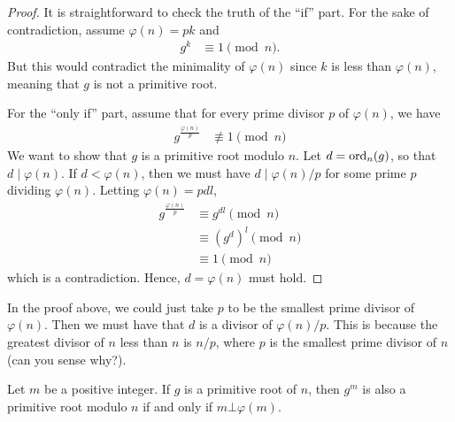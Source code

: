 \documentclass{subfile}
\begin{document}
	\begin{proof}
		It is straightforward to check the truth of the ``if'' part. For the sake of contradiction, assume $\varphi(n)=pk$ and
			\begin{align*}
				g^{k} & \equiv1\pmod n.
			\end{align*}
		But this would contradict the minimality of $\varphi(n)$ since $k$ is less than $\varphi(n)$, meaning that $g$ is not a primitive root.

		For the ``only if'' part, assume that for every prime divisor $p$ of $\varphi(n)$, we have
			\begin{align*}
				g^{\frac{\varphi(n)}{p}}
					& \not\equiv1\pmod n
			\end{align*}
		We want to show that $g$ is a primitive root modulo $n$. Let $d=\operatorname{ord}_n(g)$, so that $d \mid \varphi(n)$. If $d<\varphi(n)$, then we must have $d\mid {\varphi(n)}/{p}$ for some prime $p$ dividing $\varphi(n)$. Letting $\varphi(n)=pdl$,
			\begin{align*}
				g^{\frac{\varphi(n)}{p}}
					& \equiv g^{dl}\pmod{n}\\
					& \equiv \left(g^d\right)^l\pmod{n}\\
					& \equiv1\pmod n
			\end{align*}
		which is a contradiction. Hence, $d=\varphi(n)$ must hold.
	\end{proof}

	\begin{note}
		In the proof above, we could just take $p$ to be the smallest prime divisor of $\varphi(n)$. Then we must have that $d$ is a divisor of ${\varphi(n)}/{p}$. This is because the greatest divisor of $n$ less than $n$ is ${n}/{p}$, where $p$ is the smallest prime divisor of $n$ (can you sense why?).
	\end{note}

	\begin{corollary}\label{cor:prpower}
		Let $m$ be a positive integer. If $g$ is a primitive root of $n$, then $g^m$ is also a primitive root modulo $n$ if and only if $m \bot \varphi(m)$.
	\end{corollary}
\end{document}
